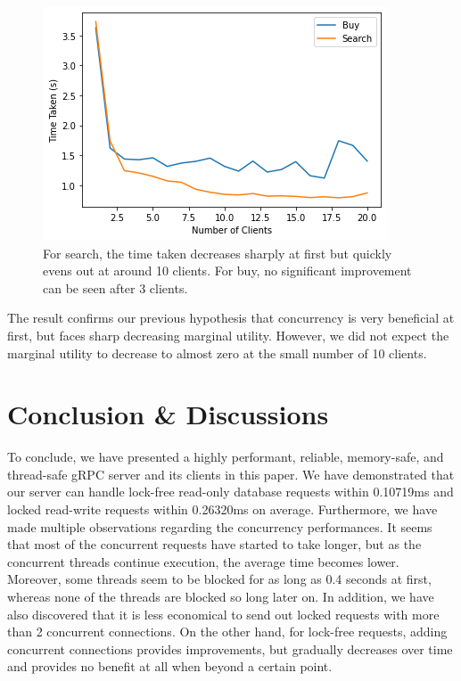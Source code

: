 \documentclass[letterpaper,11pt,twocolumn]{article}
\begin{document}
\begin{figure}[tbh]
    \centering
    \includegraphics[width=\linewidth]{time_concurrent.png}
    \caption{For search, the time taken decreases sharply at first but quickly evens out at around 10 clients. For buy, no significant improvement can be seen after 3 clients.}
    \label{fig:time-concurrent}
\end{figure}

The result confirms our previous hypothesis that concurrency is very beneficial at first, but faces sharp decreasing marginal utility. However, we did not expect the marginal utility to decrease to almost zero at the small number of 10 clients.

\section{Conclusion \& Discussions}

To conclude, we have presented a highly performant, reliable, memory-safe, and thread-safe gRPC server and its clients in this paper. We have demonstrated that our server can handle lock-free read-only database requests within 0.10719ms and locked read-write requests within 0.26320ms on average.
Furthermore, we have made multiple observations regarding the concurrency performances. It seems that most of the concurrent requests have started to take longer, but as the concurrent threads continue execution, the average time becomes lower. Moreover, some threads seem to be blocked for as long as 0.4 seconds at first, whereas none of the threads are blocked so long later on.
In addition, we have also discovered that it is less economical to send out locked requests with more than 2 concurrent connections. On the other hand, for lock-free requests, adding concurrent connections provides improvements, but gradually decreases over time and provides no benefit at all when beyond a certain point.
\end{document}
